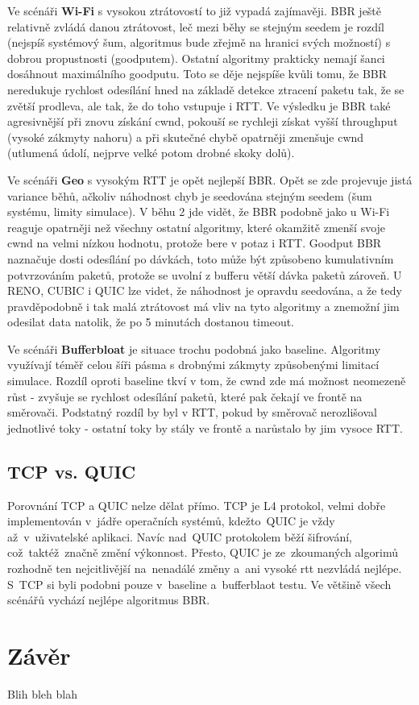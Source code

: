 \documentclass[a4paper,11pt]{article}
\begin{document}
Ve scénáři \textbf{Wi-Fi} s vysokou ztrátovostí to již vypadá zajímavěji. BBR ještě relativně zvládá danou ztrátovost, leč mezi běhy se stejným seedem je rozdíl (nejspíš systémový šum, algoritmus bude
zřejmě na hranici svých možností) s dobrou propustnosti (goodputem). Ostatní algoritmy prakticky nemají šanci dosáhnout maximálního goodputu. Toto se děje nejspíše kvůli tomu, že
BBR neredukuje rychlost odesílání hned na základě detekce ztracení paketu tak, že se zvětší prodleva, ale tak, že do toho vstupuje i RTT. Ve výsledku je BBR také agresivnější při
znovu získání cwnd, pokouší se rychleji získat vyšší throughput (vysoké zákmyty nahoru) a při skutečné chybě opatrněji zmenšuje cwnd (utlumená údolí, nejprve velké potom drobné skoky dolů).

Ve scénáři \textbf{Geo} s vysokým RTT je opět nejlepší BBR. Opět se zde projevuje jistá variance běhů, ačkoliv náhodnost chyb je seedována stejným seedem (šum systému, limity simulace).
V běhu 2 jde vidět, že BBR podobně jako u Wi-Fi reaguje opatrněji než všechny ostatní algoritmy, které okamžitě zmenší svoje cwnd na velmi nízkou hodnotu, protože bere v potaz i RTT.
Goodput BBR naznačuje dosti odesílání po dávkách, toto může být způsobeno kumulativním potvrzováním paketů, protože se uvolní z bufferu větší dávka paketů zároveň.
U RENO, CUBIC i QUIC lze videt, že náhodnost je opravdu seedována, a že tedy pravděpodobně i tak malá ztrátovost má vliv na tyto algoritmy a znemožní jim odesilat data natolik, že po 5 minutách dostanou timeout.

Ve scénáři \textbf{Bufferbloat} je situace trochu podobná jako baseline. Algoritmy využívají téměř celou šíři pásma s drobnými zákmyty způsobenými limitací simulace. Rozdíl oproti baseline
tkví v tom, že cwnd zde má možnost neomezeně růst - zvyšuje se rychlost odesílání paketů, které pak čekají ve frontě na směrovači. Podstatný rozdíl by byl v RTT, pokud by směrovač
nerozlišoval jednotlivé toky - ostatní toky by stály ve frontě a narůstalo by jim vysoce RTT.

\subsection{TCP vs. QUIC}
Porovnání TCP a QUIC nelze dělat přímo. TCP je L4 protokol, velmi dobře implementován v~jádře operačních systémů, kdežto~QUIC je vždy až~v~uživatelské aplikaci.
Navíc nad~QUIC protokolem běží šifrování, což~taktéž~značně změní výkonnost.
Přesto, QUIC je ze~zkoumaných algorimů rozhodně ten nejcitlivější na~nenadálé změny a~ani vysoké rtt nezvládá nejlépe. S~TCP si byli podobni pouze v~baseline a~bufferblaot testu.
Ve většině všech scénářů vychází nejlépe algoritmus BBR.

\section{Závěr}
Blih bleh blah

\clearpage
{}
{}
\begin{flushleft}
	
	
\end{flushleft}
\end{document}
